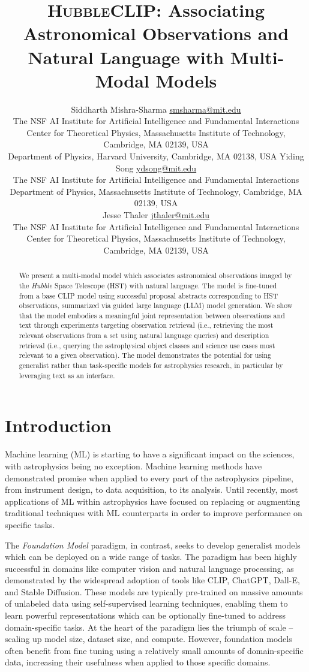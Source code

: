 \documentclass[10pt]{article} %
\title{\textsc{HubbleCLIP}: Associating Astronomical Observations and Natural Language with Multi-Modal Models}
\author{\name Siddharth Mishra-Sharma \email \href{mailto:smsharma@mit.edu}{smsharma@mit.edu} \\
      \addr The NSF AI Institute for Artificial Intelligence and Fundamental Interactions\\
      Center for Theoretical Physics, Massachusetts Institute of Technology, Cambridge, MA 02139, USA \\
      Department of Physics, Harvard University, Cambridge, MA 02138, USA
      \AND
      \name Yiding Song \email \href{mailto:ydsong@mit.edu}{ydsong@mit.edu} \\
      \addr The NSF AI Institute for Artificial Intelligence and Fundamental Interactions\\
      Department of Physics, Massachusetts Institute of Technology, Cambridge, MA 02139, USA \\
      \AND
      \name Jesse Thaler \email \href{mailto:jthaler@mit.edu}{jthaler@mit.edu} \\
      \addr The NSF AI Institute for Artificial Intelligence and Fundamental Interactions\\
      Center for Theoretical Physics, Massachusetts Institute of Technology, Cambridge, MA 02139, USA \\
}
\newcommand{\hubble}{\emph{Hubble}\xspace}
\begin{document}
\maketitle

\begin{abstract}
We present a multi-modal model which associates astronomical observations imaged by the \hubble Space Telescope (HST) with natural language. The model is fine-tuned from a base CLIP model using successful proposal abstracts corresponding to HST observations, summarized via guided large language (LLM) model generation. We show that the model embodies a meaningful joint representation between observations and text through experiments targeting observation retrieval (i.e., retrieving the most relevant observations from a set using natural language queries) and description retrieval (i.e., querying the astrophysical object classes and science use cases most relevant to a given observation). The model demonstrates the potential for using generalist rather than task-specific models for astrophysics research, in particular by leveraging text as an interface.
\end{abstract}

\section{Introduction}
\label{sec:intro}

Machine learning (ML) is starting to have a significant impact on the sciences, with astrophysics being no exception. Machine learning methods have demonstrated promise when applied to every part of the astrophysics pipeline, from instrument design, to data acquisition, to its analysis. Until recently, most applications of ML within astrophysics have focused on replacing or augmenting traditional techniques with ML counterparts in order to improve performance on specific tasks.

The \emph{Foundation Model} paradigm, in contrast, seeks to develop generalist models which can be deployed on a wide range of tasks. The paradigm has been highly successful in domains like computer vision and natural language processing, as demonstrated by the widespread adoption of tools like CLIP, ChatGPT, Dall-E, and Stable Diffusion. These models are typically pre-trained on massive amounts of unlabeled data using self-supervised learning techniques, enabling them to learn powerful representations which can be optionally fine-tuned to address domain-specific tasks. At the heart of the paradigm lies the triumph of scale -- scaling up model size, dataset size, and compute. However, foundation models often benefit from fine tuning using a relatively small amounts of domain-specific data, increasing their usefulness when applied to those specific domains.
\end{document}
